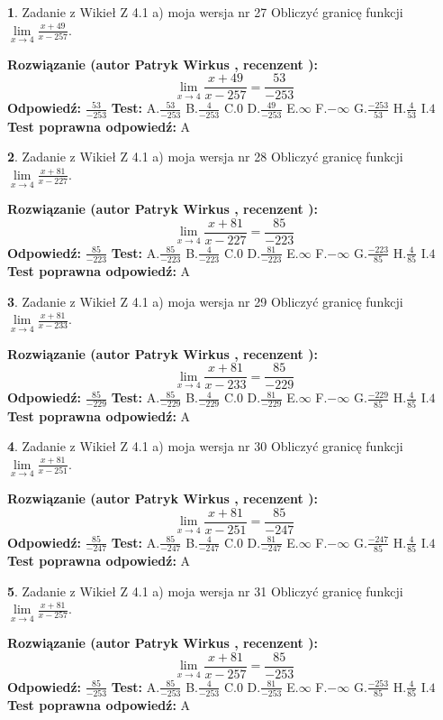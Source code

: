 \documentclass[12pt, a4paper]{article}
\theoremstyle{definition} %
\newtheorem{zad}{}
\newcommand{\zadStart}[1]{\begin{zad}#1\newline}
\newcommand{\zadStop}{\end{zad}}
\newcommand{\rozwStart}[2]{\noindent \textbf{Rozwiązanie (autor #1 , recenzent #2): }\newline}
\newcommand{\rozwStop}{\newline}
\newcommand{\odpStart}{\noindent \textbf{Odpowiedź:}\newline}
\newcommand{\odpStop}{\newline}
\newcommand{\testStart}{\noindent \textbf{Test:}\newline}
\newcommand{\testStop}{\newline}
\newcommand{\kluczStart}{\noindent \textbf{Test poprawna odpowiedź:}\newline}
\newcommand{\kluczStop}{\newline}
\begin{document}
\zadStart{Zadanie z Wikieł Z 4.1 a) moja wersja nr 27}
Obliczyć granicę funkcji $\lim\limits_{x\to4}\frac{x+49}{x-257}$.
\zadStop
\rozwStart{Patryk Wirkus}{}
$$\lim\limits_{x\to4}\frac{x+49}{x-257} = \frac{53}{-253}$$
\rozwStop
\odpStart
$\frac{53}{-253}$
\odpStop
\testStart
A.$\frac{53}{-253}$
B.$\frac{4}{-253}$
C.$0$
D.$\frac{49}{-253}$
E.$\infty$
F.$-\infty$
G.$\frac{-253}{53}$
H.$\frac{4}{53}$
I.$4$
\testStop
\kluczStart
A
\kluczStop



\zadStart{Zadanie z Wikieł Z 4.1 a) moja wersja nr 28}
Obliczyć granicę funkcji $\lim\limits_{x\to4}\frac{x+81}{x-227}$.
\zadStop
\rozwStart{Patryk Wirkus}{}
$$\lim\limits_{x\to4}\frac{x+81}{x-227} = \frac{85}{-223}$$
\rozwStop
\odpStart
$\frac{85}{-223}$
\odpStop
\testStart
A.$\frac{85}{-223}$
B.$\frac{4}{-223}$
C.$0$
D.$\frac{81}{-223}$
E.$\infty$
F.$-\infty$
G.$\frac{-223}{85}$
H.$\frac{4}{85}$
I.$4$
\testStop
\kluczStart
A
\kluczStop



\zadStart{Zadanie z Wikieł Z 4.1 a) moja wersja nr 29}
Obliczyć granicę funkcji $\lim\limits_{x\to4}\frac{x+81}{x-233}$.
\zadStop
\rozwStart{Patryk Wirkus}{}
$$\lim\limits_{x\to4}\frac{x+81}{x-233} = \frac{85}{-229}$$
\rozwStop
\odpStart
$\frac{85}{-229}$
\odpStop
\testStart
A.$\frac{85}{-229}$
B.$\frac{4}{-229}$
C.$0$
D.$\frac{81}{-229}$
E.$\infty$
F.$-\infty$
G.$\frac{-229}{85}$
H.$\frac{4}{85}$
I.$4$
\testStop
\kluczStart
A
\kluczStop



\zadStart{Zadanie z Wikieł Z 4.1 a) moja wersja nr 30}
Obliczyć granicę funkcji $\lim\limits_{x\to4}\frac{x+81}{x-251}$.
\zadStop
\rozwStart{Patryk Wirkus}{}
$$\lim\limits_{x\to4}\frac{x+81}{x-251} = \frac{85}{-247}$$
\rozwStop
\odpStart
$\frac{85}{-247}$
\odpStop
\testStart
A.$\frac{85}{-247}$
B.$\frac{4}{-247}$
C.$0$
D.$\frac{81}{-247}$
E.$\infty$
F.$-\infty$
G.$\frac{-247}{85}$
H.$\frac{4}{85}$
I.$4$
\testStop
\kluczStart
A
\kluczStop



\zadStart{Zadanie z Wikieł Z 4.1 a) moja wersja nr 31}
Obliczyć granicę funkcji $\lim\limits_{x\to4}\frac{x+81}{x-257}$.
\zadStop
\rozwStart{Patryk Wirkus}{}
$$\lim\limits_{x\to4}\frac{x+81}{x-257} = \frac{85}{-253}$$
\rozwStop
\odpStart
$\frac{85}{-253}$
\odpStop
\testStart
A.$\frac{85}{-253}$
B.$\frac{4}{-253}$
C.$0$
D.$\frac{81}{-253}$
E.$\infty$
F.$-\infty$
G.$\frac{-253}{85}$
H.$\frac{4}{85}$
I.$4$
\testStop
\kluczStart
A
\kluczStop
\end{document}
